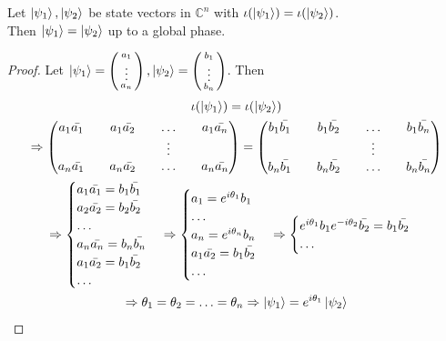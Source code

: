 \begin{lemma}
\label{lemma state into density}
Let $\ket{\psi_1}, \ket{\psi_2}$ be state vectors in ${\mathbb{C}}^n$ with $\iota({\ket{\psi_1}})=\iota(\ket{\psi_2})$.\\
Then $\ket{\psi_1}=\ket{\psi_2}$ up to a global phase.
\end{lemma}
\begin{proof}
Let $\ket{\psi_1}=\left(\begin{smallmatrix}a_1\\ \vdots \\ a_n\end{smallmatrix}\right), \ket{\psi_2}=\left(\begin{smallmatrix}b_1\\ \vdots \\ b_n\end{smallmatrix}\right)$. Then
\begin{gather}
\iota({\ket{\psi_1}})=\iota(\ket{\psi_2})\\
\Rightarrow \begin{pmatrix}
a_1 \Bar{a_1} && a_1 \Bar{a_2} && \hdots && a_1 \Bar{a_n}\\
&& && \vdots && \\
a_n \Bar{a_1} && a_n \Bar{a_2} && \hdots && a_n \Bar{a_n}\\              
\end{pmatrix}=\begin{pmatrix}
b_1 \Bar{b_1} && b_1 \Bar{b_2} && \hdots && b_1 \Bar{b_n}\\
&& && \vdots && \\
b_n \Bar{b_1} && b_n \Bar{b_2} && \hdots && b_n \Bar{b_n}\\ 
\end{pmatrix}\\
\Rightarrow 
\begin{cases}
a_1 \Bar{a_1}=b_1 \Bar{b_1}\\
a_2 \Bar{a_2}=b_2 \Bar{b_2}\\
\hdots\\
a_n \Bar{a_n}=b_n \Bar{b_n}\\
a_1 \Bar{a_2}=b_1 \Bar{b_2}\\
\hdots
\end{cases}
\Rightarrow \begin{cases}
a_1 = e^{i\theta_1}b_1\\
\hdots\\
a_n = e^{i\theta_n}b_n\\
a_1 \Bar{a_2}=b_1 \Bar{b_2}\\
\hdots
\end{cases}
\Rightarrow \begin{cases}
e^{i\theta_1}b_1 e^{-i\theta_2}\Bar{b_2}=b_1 \Bar{b_2}\\
\hdots\\
\end{cases}\\
\Rightarrow \theta_1 = \theta_2 = \hdots = \theta_n
\Rightarrow\ket{\psi_1}=e^{i\theta_1}\ket{\psi_2}
\end{gather}
\end{proof}

